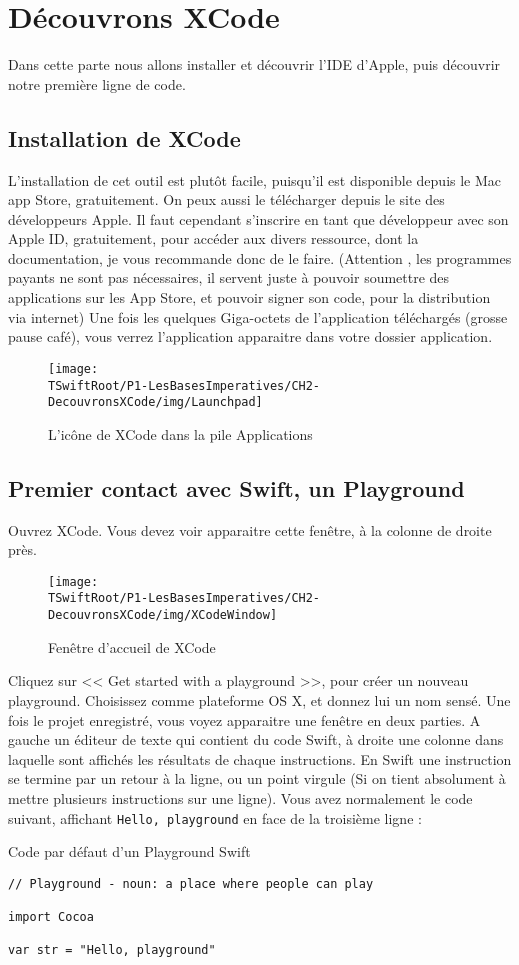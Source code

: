 \chapter{Découvrons XCode}
Dans cette parte nous allons installer et découvrir l'IDE d’Apple, puis découvrir notre
première ligne de code.
\section{Installation de XCode}
L'installation de cet outil est plutôt facile, puisqu’il est disponible depuis le Mac app Store,
gratuitement. On peux aussi le télécharger depuis le site des développeurs Apple. Il faut
cependant s'inscrire en tant que développeur avec son Apple ID, gratuitement, pour
accéder aux divers ressource, dont la documentation,
je vous recommande donc de le faire.
(Attention , les programmes payants ne sont pas nécessaires, il servent juste à pouvoir
soumettre des applications sur les App Store, et pouvoir signer son code, pour la
distribution via internet)
Une fois les quelques Giga-octets de l'application téléchargés (grosse pause café), vous
verrez l'application apparaitre dans votre dossier application.
\begin{figure}[h]
\centering
\texttt{[image: \\TSwiftRoot/P1-LesBasesImperatives/CH2-DecouvronsXCode/img/Launchpad]}
\caption{L'icône de XCode dans la pile Applications}
\end{figure}

\section{Premier contact avec Swift, un Playground}
Ouvrez XCode. Vous devez voir apparaitre cette fenêtre, à la colonne de droite près.
\begin{figure}[h]
\centering
\texttt{[image: \\TSwiftRoot/P1-LesBasesImperatives/CH2-DecouvronsXCode/img/XCodeWindow]}
\caption{Fenêtre d'accueil de XCode}
\end{figure}

Cliquez sur << Get started with a playground >>, pour créer un nouveau playground.
Choisissez comme plateforme OS X, et donnez lui un nom sensé.
Une fois le projet enregistré, vous voyez apparaitre une fenêtre en deux parties.
A gauche un éditeur de texte qui contient du code Swift, à droite une colonne dans
laquelle sont affichés les résultats de chaque instructions.
En Swift une instruction se termine par un retour à la ligne, ou un point virgule (Si on tient
absolument à mettre plusieurs instructions sur une ligne).
Vous avez normalement le code suivant, affichant \verb"Hello, playground" en face de la troisième ligne :
\begin{listing}[h]
\caption{Code par défaut d'un Playground Swift}
\begin{verbatim}
// Playground - noun: a place where people can play

import Cocoa

var str = "Hello, playground"
\end{verbatim}
\end{listing}

